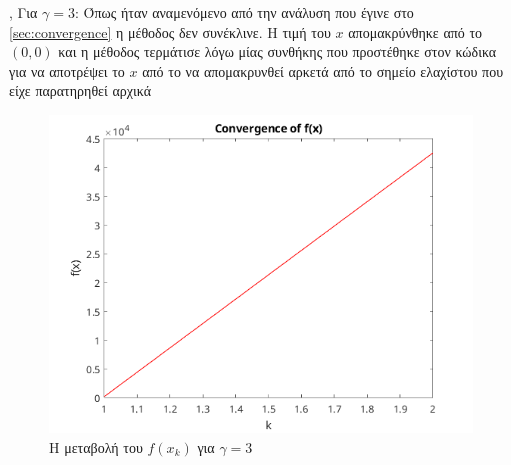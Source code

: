\begin{figure}[!h]
    \centering
    \hfill
\end{figure}
\sep
Για $\gamma = 3$:\newline
Όπως ήταν αναμενόμενο από την ανάλυση που έγινε στο \cref{sec:convergence} η μέθοδος δεν συνέκλινε.
Η τιμή του $x$ απομακρύνθηκε από το $(0, 0)$ και η μέθοδος τερμάτισε λόγω μίας συνθήκης που προστέθηκε στον κώδικα για να αποτρέψει το $x$ από το να απομακρυνθεί αρκετά από το σημείο ελαχίστου που είχε παρατηρηθεί αρχικά
\begin{figure}[!h]
    \centering
    \includegraphics[width=0.7\linewidth]{Figs/conv_1_3.png}
    \caption{Η μεταβολή του $f(x_k)$ για $\gamma = 3$}
    \label{fig:1_3}
\end{figure}
